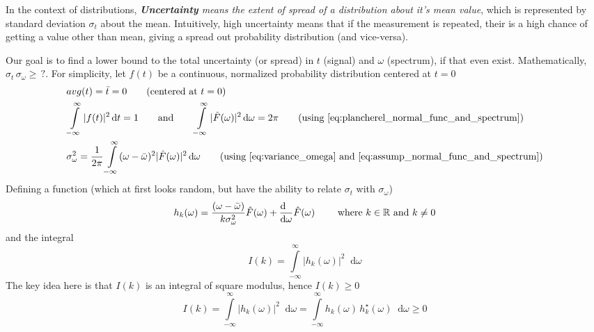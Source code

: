 \documentclass[11pt, a4paper]{article}
\newcommand{\variance}[1]{\sigma_{#1}^{2}}
\newcommand{\stdev}[1]{\sigma_{#1}}
\newcommand{\diff}{\mathop{}\!\mathrm{d}}
\newcommand{\dt}{\diff t}
\newcommand{\domega}{\diff \omega}
\newcommand{\derv}[1]{\frac{\diff \hfill}{\diff #1}}	%
\newcommand{\dint}[2]{\int \limits_{#1}^{#2}}  %
\newcommand{\intinfty}{\dint{-\infty}{\infty}}	%
\begin{document}
In the context of distributions, \textit{\textbf{Uncertainty} means the extent of spread of a distribution about it's mean value}, which is represented by standard deviation $\stdev{t}$ about the mean. Intuitively, high uncertainty means that if the measurement is repeated, their is a high chance of getting a value other than mean, giving a spread out probability distribution (and vice-versa).

\vspace{4pt}
Our goal is to find a lower bound to the total uncertainty (or spread) in $t$ (signal) and $\omega$ (spectrum), if that even exist. Mathematically, $\stdev{t}\, \stdev{\omega} \geq \, ?$. For simplicity, let $f(t)$ be a continuous, normalized probability distribution centered at $t=0$
\begin{subequations}
	\begin{align}
		& avg(t) = \bar{t} = 0 \qquad \text{(centered at $t = 0$)} \label{eq:assump_avg_t_0} \\
		& \intinfty |f(t)|^{2} \dt = 1 \qquad \text{and} \qquad \intinfty |\hat{F}(\omega)|^{2} \domega = 2\pi \qquad \text{(using \eqref{eq:plancherel_normal_func_and_spectrum})} \label{eq:assump_normal_func_and_spectrum} \\
		& \variance{\omega} = \frac{1}{2\pi} \intinfty (\omega - \bar{\omega})^{2} |\hat{F}(\omega)|^{2} \domega  \qquad \text{(using \eqref{eq:variance_omega} and \eqref{eq:assump_normal_func_and_spectrum})} \label{eq:assump_variance_omega}
	\end{align}
\end{subequations}
Defining a function (which at first looks random, but have the ability to relate $\stdev{t}$ with $\stdev{\omega}$)
\begin{equation}\label{eq:uncertainity_main_functionl}
	h_{k}(\omega) = \frac{(\omega - \bar{\omega})}{k \variance{\omega}} \hat{F}(\omega) + \derv{\omega}\hat{F}(\omega) \qquad \text{ where } k \in \mathbb{R} \text{ and } k \neq 0
\end{equation}
and the integral 
\begin{equation}\label{eq:uncertainity_main_integral}
	I(k) = \intinfty |h_{k}(\omega)|^2 \domega
\end{equation}
The key idea here is that $I(k)$ is an integral of square modulus, hence $I(k) \geq 0$
\begin{equation}\label{eq:uncertainity_main_integral_geq_0}
	I(k) = \intinfty |h_{k}(\omega)|^2 \domega = \intinfty h_{k}(\omega) \, h_{k}^{\star}(\omega) \domega \geq 0
\end{equation}
\end{document}
